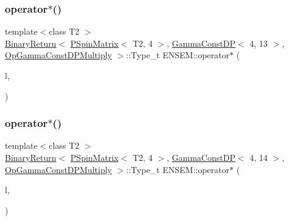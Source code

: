 \subsubsection{\texorpdfstring{operator$\ast$()}{operator*()}\hspace{0.1cm}{\footnotesize\ttfamily [62/64]}}
{\footnotesize\ttfamily template$<$class T2 $>$ \\
\mbox{\hyperlink{structENSEM_1_1BinaryReturn}{Binary\+Return}}$<$ \mbox{\hyperlink{classENSEM_1_1PSpinMatrix}{P\+Spin\+Matrix}}$<$ T2, 4 $>$, \mbox{\hyperlink{classENSEM_1_1GammaConstDP}{Gamma\+Const\+DP}}$<$ 4, 13 $>$, \mbox{\hyperlink{structENSEM_1_1OpGammaConstDPMultiply}{Op\+Gamma\+Const\+D\+P\+Multiply}} $>$\+::Type\+\_\+t E\+N\+S\+E\+M\+::operator$\ast$ (\begin{DoxyParamCaption}\item[{const \mbox{\hyperlink{classENSEM_1_1PSpinMatrix}{P\+Spin\+Matrix}}$<$ T2, 4 $>$ \&}]{l,  }\item[{const \mbox{\hyperlink{classENSEM_1_1GammaConstDP}{Gamma\+Const\+DP}}$<$ 4, 13 $>$ \&}]{ }\end{DoxyParamCaption})\hspace{0.3cm}{\ttfamily [inline]}}

\mbox{\label{group__primspinmatrix_ga701841ed0546a547ae068731f72d9054}} 
\subsubsection{\texorpdfstring{operator$\ast$()}{operator*()}\hspace{0.1cm}{\footnotesize\ttfamily [63/64]}}
{\footnotesize\ttfamily template$<$class T2 $>$ \\
\mbox{\hyperlink{structENSEM_1_1BinaryReturn}{Binary\+Return}}$<$ \mbox{\hyperlink{classENSEM_1_1PSpinMatrix}{P\+Spin\+Matrix}}$<$ T2, 4 $>$, \mbox{\hyperlink{classENSEM_1_1GammaConstDP}{Gamma\+Const\+DP}}$<$ 4, 14 $>$, \mbox{\hyperlink{structENSEM_1_1OpGammaConstDPMultiply}{Op\+Gamma\+Const\+D\+P\+Multiply}} $>$\+::Type\+\_\+t E\+N\+S\+E\+M\+::operator$\ast$ (\begin{DoxyParamCaption}\item[{const \mbox{\hyperlink{classENSEM_1_1PSpinMatrix}{P\+Spin\+Matrix}}$<$ T2, 4 $>$ \&}]{l,  }\item[{const \mbox{\hyperlink{classENSEM_1_1GammaConstDP}{Gamma\+Const\+DP}}$<$ 4, 14 $>$ \&}]{ }\end{DoxyParamCaption})\hspace{0.3cm}{\ttfamily [inline]}}

